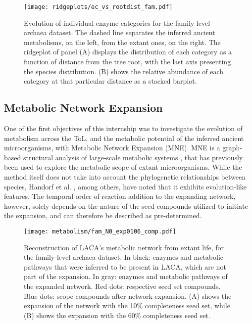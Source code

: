 \begin{figure}[H]
    \centering
    \texttt{[image: ridgeplots/ec\_vs\_rootdist\_fam.pdf]}
    \caption{Evolution of individual enzyme categories for the family-level archaea dataset. The dashed line separates the inferred ancient metabolisms, on the left, from the extant ones, on the right. The ridgeplot of panel (A) displays the distribution of each category as a function of distance from the tree root, with the last axis presenting the species distribution. (B) shows the relative abundance of each category at that particular distance as a stacked barplot.}
    \label{ec_vs_rootdist_fam}
\end{figure}  

\subsection*{Metabolic Network Expansion}

One of the first objectives of this internship was to investigate the evolution of metabolism across the ToL, and the metabolic potential of the inferred ancient microorganisms, with Metabolic Network Expansion (MNE). MNE is a graph-based structural analysis of large-scale metabolic systems \cite{ebenhoh2004}, that has previously been used to explore the metabolic scope of extant microorganisms. While the method itself does not take into account the phylogenetic relationships between species, Handorf et al. \cite{handorf2005}, among others, have noted that it exhibits evolution-like features. The temporal order of reaction addition to the expanding network, however, solely depends on the nature of the seed compounds utilized to initiate the expansion, and can therefore be described as pre-determined.

\begin{figure}[H]
    \centering
    \texttt{[image: metabolism/fam\_N0\_exp0106\_comp.pdf]}
    \caption{Reconstruction of LACA's metabolic network from extant life, for the family-level archaea dataset. In black: enzymes and metabolic pathways that were inferred to be present in LACA, which are not part of the expansion. In gray: enzymes and metabolic pathways of the expanded network. Red dots: respective seed set compounds. Blue dots: scope compounds after network expansion. (A) shows the expansion of the network with the 10\% completeness seed set, while (B) shows the expansion with the 60\% completeness seed set.}    
    \label{fam4arc_metnetexp_0106}
\end{figure}


